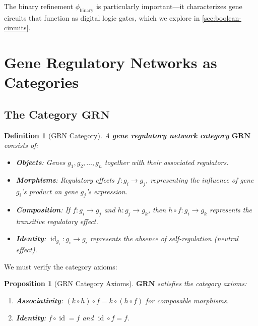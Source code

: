 \documentclass[12pt,a4paper]{article}
\newtheorem{proposition}[theorem]{Proposition}
\newtheorem{definition}[theorem]{Definition}
\newcommand{\cat}[1]{\mathbf{#1}}
\newcommand{\id}{\operatorname{id}}
\begin{document}
The binary refinement $\phi_{\text{binary}}$ is particularly important---it characterizes gene circuits that function as digital logic gates, which we explore in \cref{sec:boolean-circuits}.


\section{Gene Regulatory Networks as Categories}\label{sec:grn-categories}

\subsection{The Category $\cat{GRN}$}

\begin{definition}[GRN Category]\label{def:grn-category}
A \textbf{gene regulatory network category} $\cat{GRN}$ consists of:
\begin{itemize}
  \item \textbf{Objects}: Genes $g_1, g_2, \ldots, g_n$ together with their associated regulators.
  \item \textbf{Morphisms}: Regulatory effects $f : g_i \to g_j$, representing the influence of gene $g_i$'s product on gene $g_j$'s expression.
  \item \textbf{Composition}: If $f : g_i \to g_j$ and $h : g_j \to g_k$, then $h \circ f : g_i \to g_k$ represents the transitive regulatory effect.
  \item \textbf{Identity}: $\id_{g_i} : g_i \to g_i$ represents the absence of self-regulation (neutral effect).
\end{itemize}
\end{definition}

We must verify the category axioms:

\begin{proposition}[GRN Category Axioms]\label{prop:grn-axioms}
$\cat{GRN}$ satisfies the category axioms:
\begin{enumerate}
  \item \textbf{Associativity}: $(k \circ h) \circ f = k \circ (h \circ f)$ for composable morphisms.
  \item \textbf{Identity}: $f \circ \id = f$ and $\id \circ f = f$.
\end{enumerate}
\end{proposition}
\end{document}
